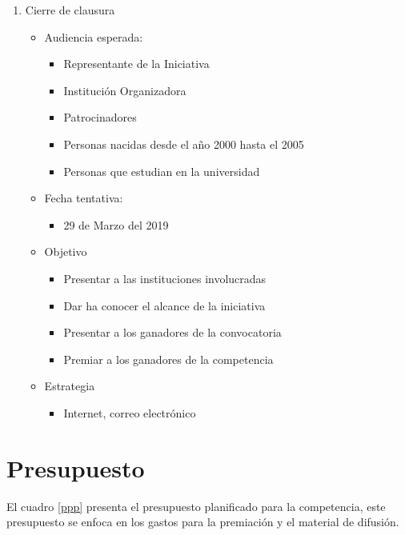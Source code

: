 \documentclass{article}
\begin{document}
\begin{enumerate}
\item Cierre de clausura
\begin{itemize}
\item Audiencia esperada:
\begin{itemize}
\item Representante de la Iniciativa
\item Institución Organizadora
\item Patrocinadores
\item Personas nacidas desde el año 2000 hasta el 2005
\item Personas que estudian en la universidad
\end{itemize}
\item Fecha tentativa:
\begin{itemize}
\item 29 de Marzo del 2019
\end{itemize}
\item Objetivo
\begin{itemize}
\item Presentar a las instituciones involucradas
\item Dar ha conocer el alcance de la iniciativa
\item Presentar a los ganadores de la convocatoria
\item Premiar a los ganadores de la competencia
\end{itemize}
\item Estrategia
\begin{itemize}
\item Internet, correo electrónico
\end{itemize}
\end{itemize}
\end{enumerate}


\section{Presupuesto}

El cuadro \ref{ppp} presenta el presupuesto planificado para la competencia, este presupuesto se enfoca en los gastos para la premiación y el material de difusión. 
\end{document}
